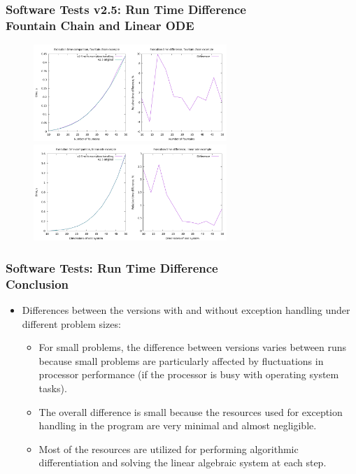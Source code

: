 \documentclass[ucs,10pt]{beamer}
\begin{document}
\begin{frame}
\frametitle{Software Tests v2.5: Run Time Difference \\
	\small \color{rwth-blue} Fountain Chain and Linear ODE}
	\begin{figure}
		\centering
		\includegraphics[width=0.65\textwidth]{figures/2.5_fountain_chain.png}
		\vspace{0.3cm}
		\includegraphics[width=0.65\textwidth]{figures/2.5_linear_ode.png}
	\end{figure}
\end{frame}
	
\begin{frame}
\frametitle{Software Tests: Run Time Difference \\
	\small \color{rwth-blue} Conclusion}
	\begin{itemize}
		\item Differences between the versions with and without exception handling under different problem sizes:
		\begin{itemize}
			\item For small problems, the difference between versions varies between runs because small problems are particularly affected by fluctuations in processor performance (if the processor is busy with operating system tasks).
			\item The overall difference is small because the resources used for exception handling in the program are very minimal and almost negligible. 
			\item Most of the resources are utilized for performing algorithmic differentiation and solving the linear algebraic system at each step.
		\end{itemize}
	\end{itemize}
\end{frame}
			
\end{document}
